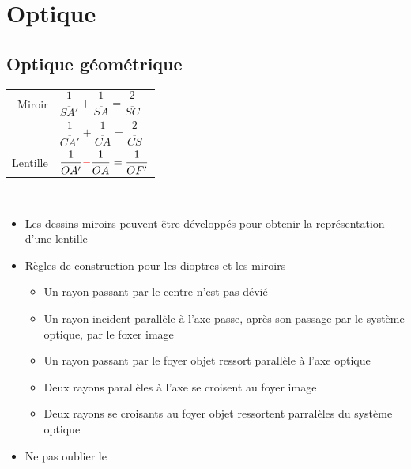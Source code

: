 \documentclass[11pt,a4paper,fleqn,pdftex]{report}
\begin{document}
\chapter{Optique}
\section{Optique géométrique} %
\label{sec:optique_geometrique}
\begin{methode}
   \begin{tabular}{ r l}
      Miroir & $\dfrac{1}{\overline{SA'}} + \dfrac{1}{\overline{SA}}=\dfrac{2}{\overline{SC}}$ \\
             & $\dfrac{1}{\overline{CA'}} + \dfrac{1}{\overline{CA}}=\dfrac{2}{\overline{CS}}$ \\
      Lentille & $\dfrac{1}{\overline{OA'}} \textcolor{couleurImp}{-} \dfrac{1}{\overline{OA}} = \dfrac{1}{\overline{OF'}}$
   \end{tabular}\\
\begin{itemize}[noitemsep, topsep=4pt,parsep=0pt,partopsep=0pt]
  \item Les dessins miroirs peuvent être \og{}développés\fg{} pour obtenir la représentation d'une lentille
  \item Règles de construction pour les dioptres et les miroirs
  \begin{itemize}[noitemsep, topsep=4pt,parsep=0pt,partopsep=0pt]
    \item Un rayon passant par le centre n'est pas dévié
    \item Un rayon incident parallèle à l'axe passe, après son passage par le système optique, par le foxer image
    \item Un rayon passant par le foyer objet ressort parallèle à l'axe optique
    \item Deux rayons parallèles à l'axe se croisent au foyer image
    \item Deux rayons se croisants au foyer objet ressortent parralèles du système optique
  \end{itemize}
  \item Ne pas oublier le 
\end{itemize}
\end{methode}
\end{document}
